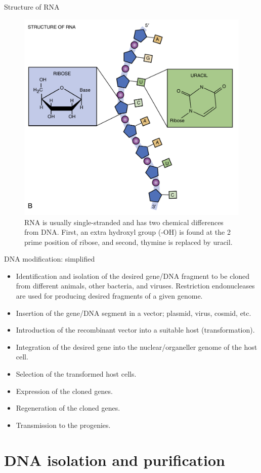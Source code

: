 \documentclass[
  ignorenonframetext,
  aspectratio=169]{beamer}
\providecommand{\tightlist}{%
  \setlength{\itemsep}{0pt}\setlength{\parskip}{0pt}}
\begin{document}
\begin{frame}{Structure of RNA}
\protect\hypertarget{structure-of-rna}{}
\begin{figure}
\includegraphics[width=0.45\linewidth]{./../images/dna_structure_b} \caption{RNA is usually single-stranded and has two chemical differences from DNA. First, an extra hydroxyl group (-OH) is found at the 2 prime position of ribose, and second, thymine is replaced by uracil.}\label{fig:nucleic-acid-rna}
\end{figure}
\end{frame}

\begin{frame}{DNA modification: simplified}
\protect\hypertarget{dna-modification-simplified}{}
\begin{itemize}
\tightlist
\item
  Identification and isolation of the desired gene/DNA fragment to be
  cloned from different animals, other bacteria, and viruses.
  Restriction endonucleases are used for producing desired fragments of
  a given genome.
\item
  Insertion of the gene/DNA segment in a vector; plasmid, virus, cosmid,
  etc.
\item
  Introduction of the recombinant vector into a suitable host
  (transformation).
\item
  Integration of the desired gene into the nuclear/organeller genome of
  the host cell.
\item
  Selection of the transformed host cells.
\item
  Expression of the cloned genes.
\item
  Regeneration of the cloned genes.
\item
  Transmission to the progenies.
\end{itemize}
\end{frame}

\hypertarget{dna-isolation-and-purification}{%
\section{DNA isolation and
purification}\label{dna-isolation-and-purification}}
\end{document}
